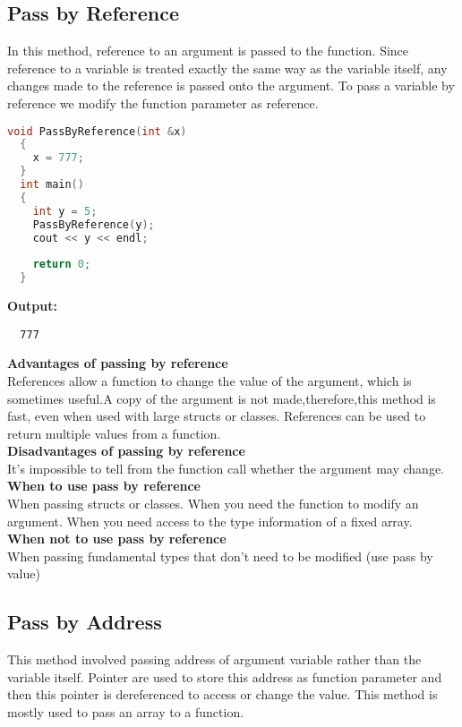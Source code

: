 \documentclass[11pt,fleqn]{book} %
\begin{document}
\subsection{Pass by Reference}
In this method, reference to an argument is passed to the function. Since reference to a variable is treated exactly the same way as the variable itself, any changes made to the reference is passed onto the argument. To pass a variable by reference we modify the function parameter as reference.\\
\begin{lstlisting}[language=C++, caption = Pass by reference]
  void PassByReference(int &x)
  {
    x = 777; 
  }
  int main()
  {
    int y = 5;
    PassByReference(y); 
    cout << y << endl;
    
    return 0;
  }
\end{lstlisting}
\textbf{Output:} 
\begin{lstlisting}
  777
\end{lstlisting}
\textbf{Advantages of passing by reference}\\
References allow a function to change the value of the argument, which is sometimes useful.A copy of the argument is not made,therefore,this method is fast, even when used with large structs or classes.
References can be used to return multiple values from a function.\\
\textbf{Disadvantages of passing by reference}\\
It’s impossible to tell from the function call whether the argument may change.\\
\textbf{When to use pass by reference}\\
When passing structs or classes.
When you need the function to modify an argument.
When you need access to the type information of a fixed array.\\
\textbf{When not to use pass by reference}\\
When passing fundamental types that don’t need to be modified (use pass by value)
\subsection{Pass by Address}
This method involved passing address of argument variable rather than the variable itself. Pointer are used to store this address as function parameter and then this pointer is dereferenced to access or change the value. This method is mostly used to pass an array to a function.
\end{document}
